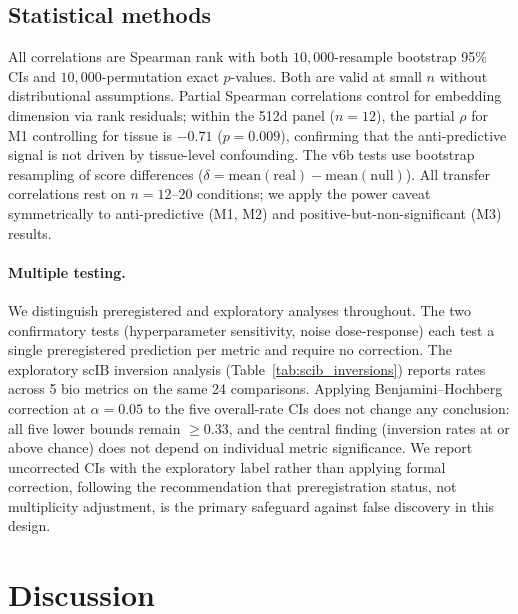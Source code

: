 \documentclass[10pt,letterpaper]{article}
\begin{document}
\subsection{Statistical methods}

All correlations are Spearman rank with both $10{,}000$-resample bootstrap 95\% CIs and $10{,}000$-permutation exact $p$-values. Both are valid at small $n$ without distributional assumptions. Partial Spearman correlations control for embedding dimension via rank residuals; within the 512d panel ($n = 12$), the partial $\rho$ for M1 controlling for tissue is $-0.71$ ($p = 0.009$), confirming that the anti-predictive signal is not driven by tissue-level confounding. The v6b tests use bootstrap resampling of score differences ($\delta = \text{mean}(\text{real}) - \text{mean}(\text{null})$). All transfer correlations rest on $n = 12$--$20$ conditions; we apply the power caveat symmetrically to anti-predictive (M1, M2) and positive-but-non-significant (M3) results.

\paragraph{Multiple testing.} We distinguish preregistered and exploratory analyses throughout. The two confirmatory tests (hyperparameter sensitivity, noise dose-response) each test a single preregistered prediction per metric and require no correction. The exploratory scIB inversion analysis (Table~\ref{tab:scib_inversions}) reports rates across 5 bio metrics on the same 24 comparisons. Applying Benjamini--Hochberg correction at $\alpha = 0.05$ to the five overall-rate CIs does not change any conclusion: all five lower bounds remain $\geq 0.33$, and the central finding (inversion rates at or above chance) does not depend on individual metric significance. We report uncorrected CIs with the exploratory label rather than applying formal correction, following the recommendation that preregistration status, not multiplicity adjustment, is the primary safeguard against false discovery in this design.


\section{Discussion}
\end{document}
